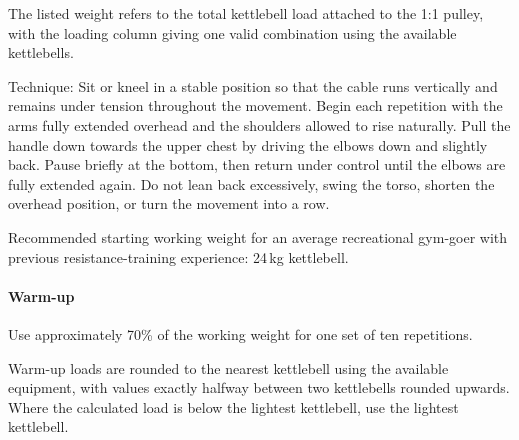 \documentclass[11pt,a4paper]{article}
\begin{document}
The listed weight refers to the total kettlebell load attached to the 1:1 pulley, with the loading column giving one valid combination using the available kettlebells.

Technique: Sit or kneel in a stable position so that the cable runs vertically and remains under tension throughout the movement. Begin each repetition with the arms fully extended overhead and the shoulders allowed to rise naturally. Pull the handle down towards the upper chest by driving the elbows down and slightly back. Pause briefly at the bottom, then return under control until the elbows are fully extended again. Do not lean back excessively, swing the torso, shorten the overhead position, or turn the movement into a row.

Recommended starting working weight for an average recreational gym-goer with previous resistance-training experience: 24\,kg kettlebell.

\paragraph{Warm-up}

Use approximately 70\% of the working weight for one set of ten repetitions.

Warm-up loads are rounded to the nearest kettlebell using the available equipment, with values exactly halfway between two kettlebells rounded upwards. Where the calculated load is below the lightest kettlebell, use the lightest kettlebell.
\end{document}
